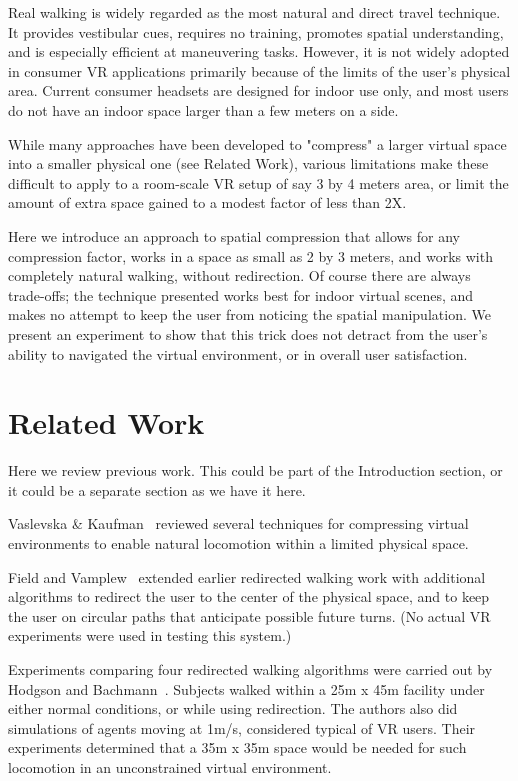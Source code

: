 \documentclass{sigchi}
\begin{document}
Real walking is widely regarded as the most natural and direct travel technique.  It provides vestibular cues, requires no training, promotes spatial understanding, and is especially efficient at maneuvering tasks.  However, it is not widely adopted in consumer VR applications primarily because of the limits of the user's physical area.  Current consumer headsets are designed for indoor use only, and most users do not have an indoor space larger than a few meters on a side.

While many approaches have been developed to "compress" a larger virtual space into a smaller physical one (see Related Work), various limitations make these difficult to apply to a room-scale VR setup of say 3 by 4 meters area, or limit the amount of extra space gained to a modest factor of less than 2X.

Here we introduce an approach to spatial compression that allows for any compression factor, works in a space as small as 2 by 3 meters, and works with completely natural walking, without redirection.  Of course there are always trade-offs; the technique presented works best for indoor virtual scenes, and makes no attempt to keep the user from noticing the spatial manipulation.  We present an experiment to show that this trick does not detract from the user's ability to navigated the virtual environment, or in overall user satisfaction.


\section{Related Work}

Here we review previous work.  This could be part of the Introduction section, or it could be a separate section as we have it here.

Vaslevska \& Kaufman~\cite{vasylevska2017compressing} reviewed several techniques for compressing virtual environments to enable natural locomotion within a limited physical space.  

Field and Vamplew~\cite{field2004generalised} extended earlier redirected walking work with additional algorithms to redirect the user to the center of the physical space, and to keep the user on circular paths that anticipate possible future turns.  (No actual VR experiments were used in testing this system.)

Experiments comparing four redirected walking algorithms were carried out by Hodgson and Bachmann~\cite{hodgson2013comparing}.  Subjects walked within a 25m x 45m facility under either normal conditions, or while using redirection.  The authors also did simulations of agents moving at 1m/s, considered typical of VR users.  Their experiments determined that a 35m x 35m space would be needed for such locomotion in an unconstrained virtual environment.
\end{document}
